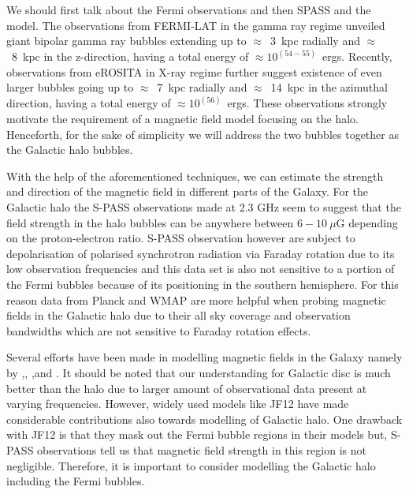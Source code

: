 \documentclass[12pt, a4 paper]{mnras}
\newcommand{\Vasu}[1]{{\color{purple}#1}}
\begin{document}
\Vasu{We should first talk about the Fermi observations and then SPASS and the model.}
The observations from FERMI-LAT \cite{Su_2010} in the gamma ray regime unveiled giant bipolar gamma ray bubbles extending up to $\approx$~3~kpc radially and $\approx$~8~kpc in the z-direction, having a total energy of $\approx 10^{(54-55)}$~ergs. Recently, observations from eROSITA \cite{eROSITA} in X-ray regime further suggest existence of even larger bubbles going up to  $\approx$~7~kpc radially and $\approx$~14~kpc in the azimuthal direction, having a total energy of $\approx 10^{(56)}$~ergs. These observations strongly motivate the requirement of a magnetic field model focusing on the halo. Henceforth, for the sake of simplicity we will address the two bubbles together as the Galactic halo bubbles.

With the help of the aforementioned techniques, we can estimate the strength and direction of the magnetic field in different parts of the Galaxy. 
For the Galactic halo the S-PASS \cite{Carretti_2013} observations  made at 2.3 GHz seem to suggest that the field strength in the halo bubbles can be anywhere between $6-10~\mu $G depending on the proton-electron ratio. S-PASS \cite{Carretti_2013} observation however are subject to depolarisation of polarised synchrotron radiation via Faraday rotation due to its low observation frequencies and this data set is also not sensitive to a portion of the Fermi bubbles because of its positioning in the southern hemisphere. For this reason data from Planck and WMAP are more helpful when probing magnetic fields in the Galactic halo due to their all sky coverage and observation bandwidths which are not sensitive to Faraday rotation effects.


Several efforts have  been made in modelling magnetic fields in the Galaxy namely by \cite{Jaffe_2010},\cite{Jaffe_2011}, \cite{Sun_2008},and \cite{JF12}. It should be noted that our understanding for Galactic disc is much better than the halo due to larger amount of observational data present at varying frequencies. However, widely used models like JF12 \cite{JF12} have made considerable contributions also towards modelling of Galactic halo. One drawback with JF12 \cite{JF12} is that they mask out the Fermi bubble regions in their models but, S-PASS\cite{Carretti_2013} observations tell us that magnetic field strength in this region is not negligible. Therefore, it is important to consider modelling the Galactic halo including the Fermi bubbles.
\end{document}
